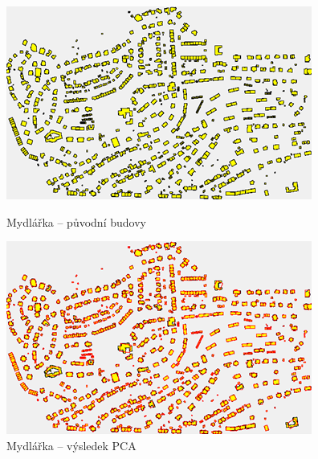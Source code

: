 \documentclass{article}
\begin{document}
\begin{spacing}{1.5}
\begin{figure}[htbp]
  \centering
  \begin{minipage}[b]{0.47\textwidth}
    \includegraphics[width=\textwidth]{images/Mydl_orig.png}
    \caption{Mydlářka – původní budovy}
  \end{minipage}
  \hfill
  \begin{minipage}[b]{0.47\textwidth}
    \includegraphics[width=\textwidth]{images/Mydl_pca.png}
    \caption{Mydlářka – výsledek PCA}
  \end{minipage}
\end{figure}


\end{spacing}
\end{document}
